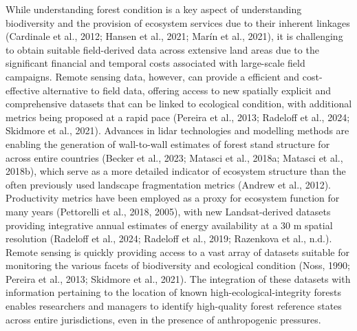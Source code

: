 \documentclass[
]{agujournal2019}
\begin{document}
While understanding forest condition is a key aspect of understanding
biodiversity and the provision of ecosystem services due to their
inherent linkages (Cardinale et al., 2012; Hansen et al., 2021; Marín et
al., 2021), it is challenging to obtain suitable field-derived data
across extensive land areas due to the significant financial and
temporal costs associated with large-scale field campaigns. Remote
sensing data, however, can provide a efficient and cost-effective
alternative to field data, offering access to new spatially explicit and
comprehensive datasets that can be linked to ecological condition, with
additional metrics being proposed at a rapid pace (Pereira et al., 2013;
Radeloff et al., 2024; Skidmore et al., 2021). Advances in lidar
technologies and modelling methods are enabling the generation of
wall-to-wall estimates of forest stand structure for across entire
countries (Becker et al., 2023; Matasci et al., 2018a; Matasci et al.,
2018b), which serve as a more detailed indicator of ecosystem structure
than the often previously used landscape fragmentation metrics (Andrew
et al., 2012). Productivity metrics have been employed as a proxy for
ecosystem function for many years (Pettorelli et al., 2018, 2005), with
new Landsat-derived datasets providing integrative annual estimates of
energy availability at a 30 m spatial resolution (Radeloff et al., 2024;
Radeloff et al., 2019; Razenkova et al., n.d.). Remote sensing is
quickly providing access to a vast array of datasets suitable for
monitoring the various facets of biodiversity and ecological condition
(Noss, 1990; Pereira et al., 2013; Skidmore et al., 2021). The
integration of these datasets with information pertaining to the
location of known high-ecological-integrity forests enables researchers
and managers to identify high-quality forest reference states across
entire jurisdictions, even in the presence of anthropogenic pressures.
\end{document}
